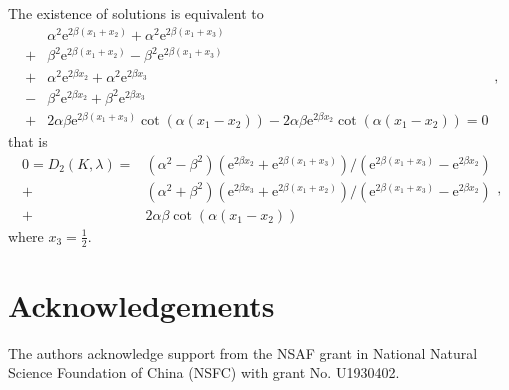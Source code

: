 \documentclass[a4paper,11pt]{article}
\begin{document}
\begin{appendices}
The existence of solutions is equivalent to
\begin{equation*}
\begin{split}
& \alpha^2 \mathrm{e}^{2 \beta (x_{1} + x_{2})}  + \alpha^2 \mathrm{e}^{2 \beta (x_{1} + x_{3})} \\
+ & \beta^2 \mathrm{e}^{2 \beta (x_{1} + x_{2})} - \beta^2 \mathrm{e}^{2 \beta (x_{1} + x_{3})} \\
+ & \alpha^2 \mathrm{e}^{2 \beta x_{2}}  + \alpha^2 \mathrm{e}^{2 \beta x_{3}} \\
- & \beta^2 \mathrm{e}^{2 \beta x_{2}} + \beta^2 \mathrm{e}^{2 \beta x_{3}} \\
+ & 2 \alpha \beta \mathrm{e}^{2 \beta (x_{1} + x_{3})} \cot(\alpha (x_{1} - x_{2})) - 2 \alpha \beta \mathrm{e}^{2 \beta x_{2}} \cot(\alpha (x_{1} - x_{2})) = 0
\end{split},
\end{equation*}
that is
\begin{equation*}
\begin{split}
0 = D_2(K, \lambda) = & (\alpha^2 - \beta^2)(\mathrm{e}^{2 \beta x_2} + \mathrm{e}^{2 \beta (x_1+x_3)}) / (\mathrm{e}^{2 \beta (x_1+x_3)} - \mathrm{e}^{2 \beta x_2}) \\
+ & (\alpha^2 + \beta^2)(\mathrm{e}^{2 \beta x_3} + \mathrm{e}^{2 \beta (x_1+x_2)}) / (\mathrm{e}^{2 \beta (x_1+x_3)} - \mathrm{e}^{2 \beta x_2}) \\
+ & 2 \alpha \beta \cot(\alpha (x_1 - x_2))
\end{split},
\end{equation*}
where $x_3 = \frac12$.

\end{appendices}

\section*{Acknowledgements}
The authors acknowledge support from the NSAF grant in National Natural Science Foundation of China (NSFC) with grant No. U1930402.

\setlength{\bibsep}{5pt}
\small

\end{document}
